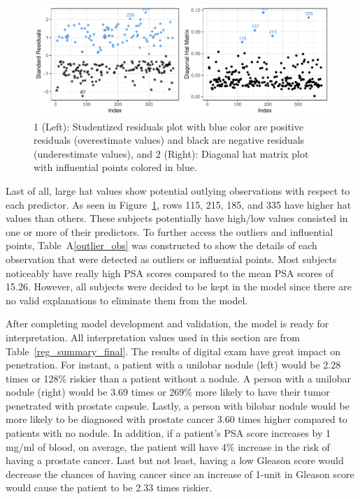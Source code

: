 \documentclass[11pt]{article}\usepackage[]{graphicx}\usepackage[]{color}
\makeatletter
\def\maxwidth{ %
  \ifdim\Gin@nat@width>\linewidth
    \linewidth
  \else
    \Gin@nat@width
  \fi
}
\makeatother
\begin{document}
\begin{figure}[h!] 
\begin{center}

\includegraphics[width=\maxwidth]{figure/unnamed-chunk-5-1} 

\caption{1 (Left): Studentized residuals plot with blue color are positive residuals (overestimate values) and black are negative residuals (underestimate values), and 2 (Right): Diagonal hat matrix plot with influential points colored in blue.}
\label{model_plot_2}
\end{center} 
\end{figure}

\noindent Last of all, large hat values show potential outlying observations with respect to each predictor. As seen in Figure~\ref{model_plot_2}, rows 115, 215, 185, and 335 have higher hat values than others. These subjects potentially have high/low values consisted in one or more of their predictors. To further access the outliers and influential points, Table~A\ref{outlier_obs} was constructed to show the details of each observation that were detected as outliers or influential points. Most subjects noticeably have really high PSA scores compared to the mean PSA scores of 15.26. However, all subjects were decided to be kept in the model since there are no valid explanations to eliminate them from the model.       
\hfill \break

\noindent After completing model development and validation, the model is ready for interpretation. All interpretation values used in this section are from Table~\ref{reg_summary_final}. The results of digital exam have great impact on penetration. For instant, a patient with a unilobar nodule (left) would be 2.28 times or 128\% riskier than a patient without a nodule. A person with a unilobar nodule (right) would be 3.69 times or 269\% more likely to have their tumor penetrated with prostate capsule. Lastly, a person with bilobar nodule would be more likely to be diagnosed with prostate cancer 3.60 times higher compared to patients with no nodule. In addition, if a patient’s PSA score increases by 1 mg/ml of blood, on average, the patient will have 4\% increase in the risk of having a prostate cancer. Last but not least, having a low Gleason score would decrease the chances of having cancer since an increase of 1-unit in Gleason score would cause the patient to be 2.33 times riskier.   
\hfill \break
\end{document}

